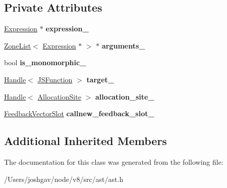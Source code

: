 \subsection*{Private Attributes}
\begin{DoxyCompactItemize}
\item 
\hyperlink{classv8_1_1internal_1_1_expression}{Expression} $\ast$ {\bfseries expression\+\_\+}\hypertarget{classv8_1_1internal_1_1_call_new_af010e6e5af7d5c1b745795b5630c3ec0}{}\label{classv8_1_1internal_1_1_call_new_af010e6e5af7d5c1b745795b5630c3ec0}

\item 
\hyperlink{classv8_1_1internal_1_1_zone_list}{Zone\+List}$<$ \hyperlink{classv8_1_1internal_1_1_expression}{Expression} $\ast$ $>$ $\ast$ {\bfseries arguments\+\_\+}\hypertarget{classv8_1_1internal_1_1_call_new_ab43de144e651bbd175a84ec23a181fec}{}\label{classv8_1_1internal_1_1_call_new_ab43de144e651bbd175a84ec23a181fec}

\item 
bool {\bfseries is\+\_\+monomorphic\+\_\+}\hypertarget{classv8_1_1internal_1_1_call_new_acd6b3ca598c82246e374c3be3a94c82f}{}\label{classv8_1_1internal_1_1_call_new_acd6b3ca598c82246e374c3be3a94c82f}

\item 
\hyperlink{classv8_1_1internal_1_1_handle}{Handle}$<$ \hyperlink{classv8_1_1internal_1_1_j_s_function}{J\+S\+Function} $>$ {\bfseries target\+\_\+}\hypertarget{classv8_1_1internal_1_1_call_new_a95d7af4ccc5f48c1a28e9078d26826a6}{}\label{classv8_1_1internal_1_1_call_new_a95d7af4ccc5f48c1a28e9078d26826a6}

\item 
\hyperlink{classv8_1_1internal_1_1_handle}{Handle}$<$ \hyperlink{classv8_1_1internal_1_1_allocation_site}{Allocation\+Site} $>$ {\bfseries allocation\+\_\+site\+\_\+}\hypertarget{classv8_1_1internal_1_1_call_new_a65721bf24ea0ffe73c16a733b052063f}{}\label{classv8_1_1internal_1_1_call_new_a65721bf24ea0ffe73c16a733b052063f}

\item 
\hyperlink{classv8_1_1internal_1_1_feedback_vector_slot}{Feedback\+Vector\+Slot} {\bfseries callnew\+\_\+feedback\+\_\+slot\+\_\+}\hypertarget{classv8_1_1internal_1_1_call_new_abd92ed1c8a1bc315a570e2b2b15ec75a}{}\label{classv8_1_1internal_1_1_call_new_abd92ed1c8a1bc315a570e2b2b15ec75a}

\end{DoxyCompactItemize}
\subsection*{Additional Inherited Members}


The documentation for this class was generated from the following file\+:\begin{DoxyCompactItemize}
\item 
/\+Users/joshgav/node/v8/src/ast/ast.\+h\end{DoxyCompactItemize}
